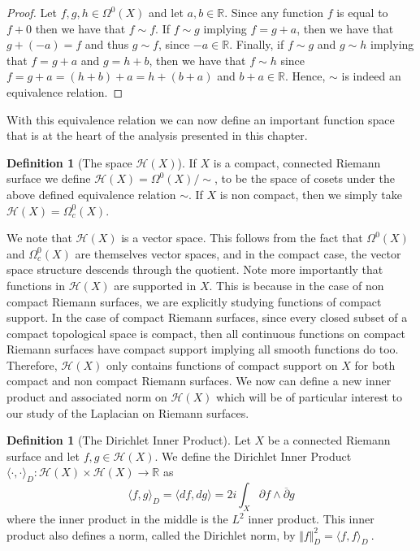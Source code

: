 \documentclass[11pt]{report}
\theoremstyle{definition}
\newtheorem{defn}[thm]{Definition}
\begin{document}
\begin{proof}
  Let $f,g,h \in \Omega^0(X)$ and let $a, b \in \mathbb{R}$. Since any function $f$ is equal to $f + 0$ then we have that $f \sim f$. If $f \sim g$ implying $f = g + a$, then we have that $g + (-a) = f$ and thus $g \sim f$, since $-a \in \mathbb{R}$. Finally, if $f \sim g$ and $g \sim h$ implying that $f = g + a$ and $g = h + b$, then we have that $f \sim h$ since $f = g + a = (h + b) + a = h + (b + a)$ and $b+a \in \mathbb{R}$. Hence, $\sim$ is indeed an equivalence relation. 
\end{proof}
With this equivalence relation we can now define an important function space that is at the heart of the analysis presented in this chapter.
\begin{defn}[The space $\mathcal{H}(X)$]
  If $X$ is a compact, connected Riemann surface we define $\mathcal{H}(X) = \Omega^0(X)/\sim$, to be the space of cosets under the above defined equivalence relation $\sim$. If $X$ is non compact, then we simply take $\mathcal{H}(X)=\Omega_c^0(X)$.
\end{defn}

We note that $\mathcal{H}(X)$ is a vector space. This follows from the fact that $\Omega^0(X)$ and $\Omega^0_c(X)$ are themselves vector spaces, and in the compact case, the vector space structure descends through the quotient. Note more importantly that functions in $\mathcal{H}(X)$ are supported in $X$. This is because in the case of non compact Riemann surfaces, we are explicitly studying functions of compact support. In the case of compact Riemann surfaces, since every closed subset of a compact topological space is compact, then all continuous functions on compact Riemann surfaces have compact support implying all smooth functions do too. Therefore, $\mathcal{H}(X)$ only contains functions of compact support on $X$ for both compact and non compact Riemann surfaces. We now can define a new inner product and associated norm on $\mathcal{H}(X)$ which will be of particular interest to our study of the Laplacian on Riemann surfaces.

\begin{defn}[The Dirichlet Inner Product]\label{dInnerProduct}
  Let $X$ be a connected Riemann surface and let $f, g \in \mathcal{H}(X)$.
  We define the Dirichlet Inner Product $\langle \cdot, \cdot \rangle_D : \mathcal{H}(X) \times \mathcal{H}(X) \rightarrow \mathbb{R}$ as 
  \[
    \langle f, g \rangle_D =\langle df, dg \rangle = 2i \int_X \partial f \wedge \overline{\partial} g 
  \]
  where the inner product in the middle is the $L^2$ inner product.
  This inner product also defines a norm, called the Dirichlet norm, by $\Vert f\Vert _D^2 = \langle f, f \rangle_D\ $.
\end{defn}
\end{document}
